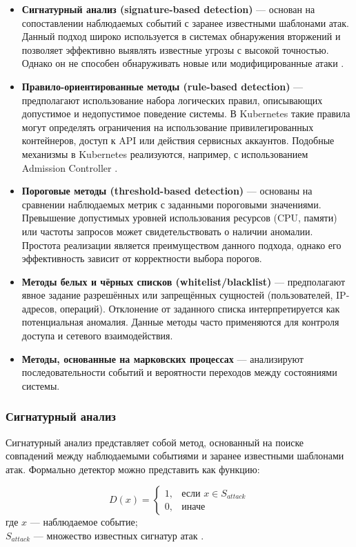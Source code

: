\begin{itemize}
    \item \textbf{Сигнатурный анализ (signature-based detection)} — основан на сопоставлении наблюдаемых событий с заранее известными шаблонами атак. Данный подход широко используется в системах обнаружения вторжений и позволяет эффективно выявлять известные угрозы с высокой точностью. Однако он не способен обнаруживать новые или модифицированные атаки \cite{Lightweight_Detection_Networks}.
    \item \textbf{Правило-ориентированные методы (rule-based detection)} — предполагают использование набора логических правил, описывающих допустимое и недопустимое поведение системы. В Kubernetes такие правила могут определять ограничения на использование привилегированных контейнеров, доступ к API или действия сервисных аккаунтов. Подобные механизмы в Kubernetes реализуются, например, с использованием Admission Controller \cite{KubernetesSecurityDocs}.
    \item \textbf{Пороговые методы (threshold-based detection)} — основаны на сравнении наблюдаемых метрик с заданными пороговыми значениями. Превышение допустимых уровней использования ресурсов (CPU, памяти) или частоты запросов может свидетельствовать о наличии аномалии. Простота реализации является преимуществом данного подхода, однако его эффективность зависит от корректности выбора порогов.
    \item \textbf{Методы белых и чёрных списков (whitelist/blacklist)} — предполагают явное задание разрешённых или запрещённых сущностей (пользователей, IP-адресов, операций). Отклонение от заданного списка интерпретируется как потенциальная аномалия. Данные методы часто применяются для контроля доступа и сетевого взаимодействия.
    \item \textbf{Методы, основанные на марковских процессах} — анализируют последовательности событий и вероятности переходов между состояниями системы.
\end{itemize}

\subsubsection{Сигнатурный анализ}

Сигнатурный анализ представляет собой метод, основанный на поиске совпадений между наблюдаемыми событиями и заранее известными шаблонами атак. Формально детектор можно представить как функцию:

$$
D(x) =
\begin{cases}
1, & \text{если } x \in S_{attack} \\
0, & \text{иначе}
\end{cases}
$$
где \(x\) — наблюдаемое событие; \\ \(S_{attack}\) — множество известных сигнатур атак \cite{IDS_survey_and_taxonomy}.

